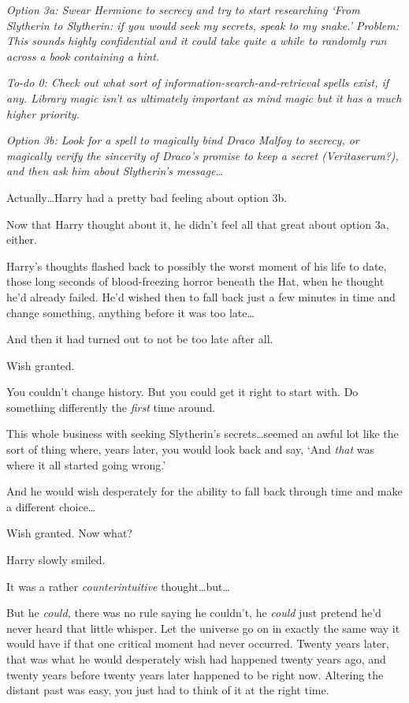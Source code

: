 \emph{Option 3a: Swear Hermione to secrecy and try to start researching ‘From Slytherin to Slytherin: if you would seek my secrets, speak to my snake.’ Problem: This sounds highly confidential and it could take quite a while to randomly run across a book containing a hint.}

\emph{To-do 0: Check out what sort of information-search-and-retrieval spells exist, if any. Library magic isn’t as ultimately important as mind magic but it has a much higher priority.}

\emph{Option 3b: Look for a spell to magically bind Draco Malfoy to secrecy, or magically verify the sincerity of Draco’s promise to keep a secret (Veritaserum?), and then ask \emph{him} about Slytherin’s message…}

Actually…Harry had a pretty bad feeling about option 3b.

Now that Harry thought about it, he didn’t feel all that great about option 3a, either.

Harry’s thoughts flashed back to possibly the worst moment of his life to date, those long seconds of blood-freezing horror beneath the Hat, when he thought he’d already failed. He’d wished then to fall back just a few minutes in time and change something, anything before it was too late…

And then it had turned out to not be too late after all.

Wish granted.

You couldn’t change history. But you could get it right to start with. Do something differently the \emph{first} time around.

This whole business with seeking Slytherin’s secrets…seemed an awful lot like the sort of thing where, years later, you would look back and say, ‘And \emph{that} was where it all started going wrong.’

And he would wish desperately for the ability to fall back through time and make a different choice…

Wish granted. Now what?

Harry slowly smiled.

It was a rather \emph{counterintuitive} thought…but…

But he \emph{could,} there was no rule saying he couldn’t, he \emph{could} just pretend he’d never heard that little whisper. Let the universe go on in exactly the same way it would have if that one critical moment had never occurred. Twenty years later, that was what he would desperately wish had happened twenty years ago, and twenty years before twenty years later happened to be right now. Altering the distant past was easy, you just had to think of it at the right time.

